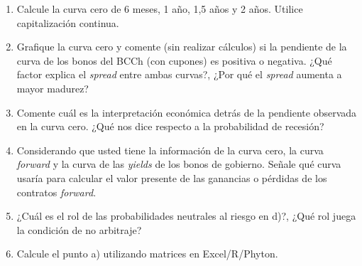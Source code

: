 \documentclass[12pt]{article}
\begin{document}
\begin{enumerate}[label=\textbf{\alph*)}]
    \item Calcule la curva cero de 6 meses, 1 año, 1,5 años y 2 años.
     Utilice capitalización continua.
    
    \item Grafique la curva cero y comente (sin realizar cálculos) si 
    la pendiente de la curva de los bonos del BCCh (con cupones) es 
    positiva o negativa. ¿Qué factor explica el \textit{spread} entre 
    ambas curvas?, ¿Por qué el \textit{spread} aumenta a mayor madurez?
    
    \item Comente cuál es la interpretación económica detrás de la 
    pendiente observada en la curva cero. ¿Qué nos dice respecto a 
    la probabilidad de recesión?
    
    \item Considerando que usted tiene la información de la curva cero, 
    la curva \textit{forward} y la curva de las \textit{yields} de los 
    bonos de gobierno. Señale qué curva usaría para calcular el valor 
    presente de las ganancias o pérdidas de los contratos \textit{forward}.
    
    \item ¿Cuál es el rol de las probabilidades neutrales al riesgo en d)?, 
    ¿Qué rol juega la condición de no arbitraje?
    
    \item Calcule el punto a) utilizando matrices en Excel/R/Phyton.
\end{enumerate}
\end{document}
